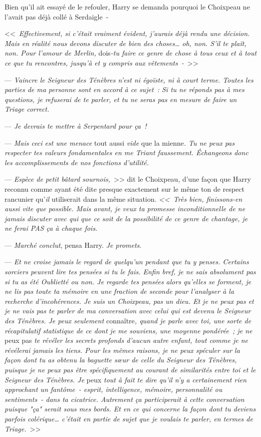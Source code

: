 Bien qu'il ait essayé de le refouler, Harry se demanda pourquoi le Choixpeau ne l'avait pas déjà collé à Serdaigle~-

<<~\emph{Effectivement, si c'était vraiment évident, j'aurais déjà rendu une décision. Mais en réalité nous devons discuter de bien des choses… oh, non. S'il te plaît, non. Pour l'amour de Merlin,} dois\emph{-tu faire ce genre de chose à tous ceux et à tout ce que tu rencontres, jusqu'à et y compris aux vêtements~-}~>>

--- \emph{Vaincre le Seigneur des Ténèbres n'est ni égoïste, ni à court terme. Toutes les parties de ma personne sont en accord à ce sujet~: Si tu ne réponds pas à mes questions, je refuserai de te parler, et tu ne seras pas en mesure de faire un Triage correct.}

--- \emph{Je devrais te mettre à Serpentard pour ça~!}

--- \emph{Mais ceci est une menace} tout aussi \emph{vide} que la mienne\emph{. Tu ne peux pas respecter tes valeurs fondamentales en me Triant faussement. Échangeons donc les accomplissements de nos fonctions d'utilité.}

--- \emph{Espèce de petit bâtard sournois,}~>> dit le Choixpeau, d'une façon que Harry reconnu comme ayant été dite presque exactement sur le même ton de respect rancunier qu'\emph{il} utiliserait dans la même situation. \emph{<<~Très bien, finissons-en aussi vite que possible. Mais avant, je veux ta promesse inconditionnelle de ne jamais discuter avec qui que ce soit de la possibilité de ce genre de chantage, je ne ferai PAS ça à chaque fois.}

--- \emph{Marché conclut}, pensa Harry. \emph{Je promets}.

--- \emph{Et ne croise jamais le regard de quelqu'un pendant que tu y penses. Certains sorciers peuvent lire tes pensées si tu le fais. Enfin bref, je ne sais absolument pas si tu as été Oublietté ou non. Je regarde tes pensées alors qu'elles se forment, je ne lis pas toute ta mémoire en une fraction de seconde pour l'analyser à la recherche d'incohérences. Je suis un Choixpeau, pas un dieu. Et je ne peux pas et je ne vais pas te parler de ma conversation avec celui qui est devenu le Seigneur des Ténèbres. Je peux seulement} connaître\emph{, quand je parle avec toi, une sorte de récapitulatif statistique de ce dont je me souviens, une moyenne pondérée~; je ne} peux pas \emph{te révéler les secrets profonds d'aucun autre enfant, tout comme je ne révélerai jamais les tiens. Pour les mêmes raisons, je ne peux spéculer sur la façon dont tu as obtenu la baguette sœur de celle du Seigneur des Ténèbres, puisque je ne peux pas être spécifiquement au courant de similarités entre toi et le Seigneur des Ténèbres. Je} peux \emph{tout à fait te dire qu'il n'y a certainement rien approchant un fantôme~- esprit, intelligence, mémoire, personnalité ou sentiments~- dans ta cicatrice. Autrement ça participerait à cette conversation puisque "ça" serait sous mes bords. Et en ce qui concerne la façon dont tu deviens parfois colérique… c'était en partie de sujet que je voulais te parler, en termes de Triage.}~>>

